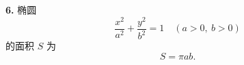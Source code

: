 \documentclass[UTF8]{ctexart}
\begin{document}
\noindent\textbf{6.} 椭圆
\[
\frac{x^2}{a^2}+\frac{y^2}{b^2}=1 \quad (a>0,\ b>0)
\]
的面积 $S$ 为
\[
S=\pi ab.
\]
\end{document}
